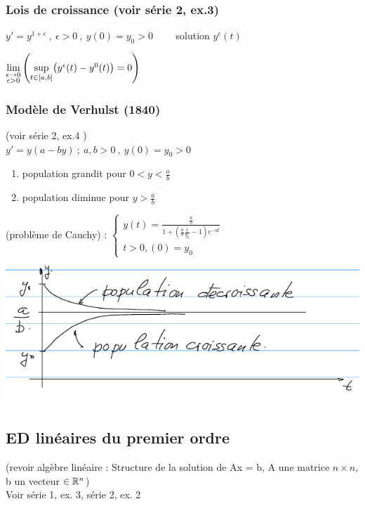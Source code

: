 \documentclass[12pt,a4paper]{article}
\begin{document}
\subsubsection*{Lois de croissance (voir série 2, ex.3)}
$y' = y^{1+\epsilon} \ , \ \epsilon > 0 \ , \ y(0) = y_0 > 0 \qquad$ solution $y^\epsilon(t)$
\begin{boite}[0.45]
	$\lim\limits_{\substack{\epsilon \to 0 \\ \epsilon > 0}}\left(\underset{t\in[a,b]}{\sup} \big(y^\epsilon(t) - y^0(t)\big) = 0\right)$
\end{boite}

\subsubsection*{Modèle de Verhulst (1840)}
(voir série 2, ex.4 )\\
$y' = y(a-by) \ ; \ a,b>0 \ , \ y(0) = y_0 >0$
\begin{enumerate}
	\item population grandit pour $0 < y < \frac{a}{b}$
	\item population diminue pour $y > \frac{a}{b}$
\end{enumerate}
 (problème de Cauchy) : 
$\left\{
	\begin{array}{l}
		y(t) = \frac{\frac{a}{b}}{1+(\frac{a}{b} \frac{1}{y_0}-1)e^{-at}}\\
		t>0, (0) = y_0
	\end{array}\right.$\\
\includegraphics[scale=0.5]{images/verhulst}

\subsection{ED linéaires du premier ordre}
(revoir algèbre linéaire : Structure de la solution de Ax = b, A une matrice $n\times n$, b un vecteur $\in \mathbb{R}^n$)\\
Voir série 1, ex. 3, série 2, ex. 2
\end{document}
